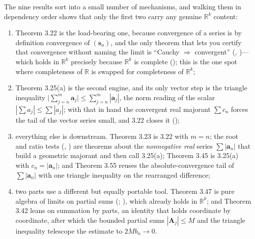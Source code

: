 \documentclass[main.tex]{subfiles}
\begin{document}
\begin{Reflection}
The nine results sort into a small number of mechanisms, and walking them in dependency order shows that
only the first two carry any genuine $\mathbb R^k$ content:
\begin{enumerate}[leftmargin=1.7em,itemsep=3pt,topsep=2pt,label=\textnormal{(\arabic*)}]
  \item Theorem 3.22 is the load-bearing one, because convergence of a series is by definition
        convergence of $(\mathbf s_n)$, and the only theorem that lets you certify that convergence
        without naming the limit is ``Cauchy $\Rightarrow$ convergent'' (,
        )---which holds in $\mathbb R^k$ precisely because $\mathbb R^k$ is complete
        (); this is the one spot where
        completeness of $\mathbb R$ is swapped for completeness of $\mathbb R^k$;
  \item Theorem 3.25(a) is the second engine, and its only vector step is the triangle inequality
        $\bigl|\sum_{j=n}^{m}\mathbf a_j\bigr|\le\sum_{j=n}^{m}|\mathbf a_j|$, the norm reading of the
        scalar $|\sum a_j|\le\sum|a_j|$; with that in hand the convergent real majorant $\sum c_n$ forces
        the tail of the vector series small, and 3.22 closes it ();
  \item everything else is downstream. Theorem 3.23 is 3.22 with $m=n$; the root and ratio tests
        (, ) are theorems about the \emph{nonnegative real} series $\sum|\mathbf
        a_n|$ that build a geometric majorant and then call 3.25(a); Theorem 3.45 is 3.25(a) with
        $c_n=|\mathbf a_n|$; and Theorem 3.55 reuses the absolute-convergence tail of $\sum|\mathbf a_n|$
        with one triangle inequality on the rearranged difference;
  \item two parts use a different but equally portable tool. Theorem 3.47 is pure algebra of limits on
        partial sums (; ), which already holds
        in $\mathbb R^k$; and Theorem 3.42 leans on summation by parts, an identity that holds coordinate
        by coordinate, after which the bounded partial sums $|\mathbf A_j|\le M$ and the triangle
        inequality telescope the estimate to $2Mb_n\to 0$.
\end{enumerate}


\end{Reflection}
\end{document}

